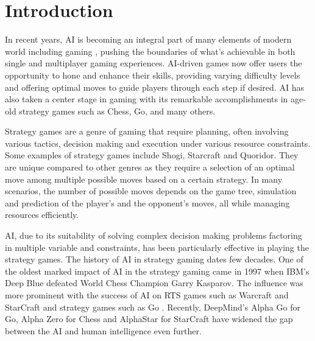 \chapter{Introduction}

In recent years, \gls{AI} is becoming an integral part of many elements of modern world including gaming \citep{Skinner2010Artificial}, pushing the boundaries of what's achievable in both single and multiplayer gaming experiences. \gls{AI}-driven games now offer users the opportunity to hone and enhance their skills, providing varying difficulty levels and offering optimal moves to guide players through each step if desired. \gls{AI} has also taken a center stage in gaming with its remarkable accomplishments in age-old strategy games such as Chess, Go, and many others. 

% 

Strategy games are a genre of gaming that require planning, often involving various tactics, decision making and execution under various resource constraints. Some examples of strategy games include Shogi, Starcraft and Quoridor. They are unique compared to other genres as they require a selection of an optimal move among multiple possible moves based on a certain strategy. In many scenarios, the number of possible moves depends on the game tree, simulation and prediction of the player's and the opponent's moves, all while managing resources efficiently.

\gls{AI}, due to its suitability of solving complex decision making problems factoring in multiple variable and constraints, has been particularly effective in playing the strategy games. The history of \gls{AI} in strategy gaming dates few decades. One of the oldest marked impact of \gls{AI} in the strategy gaming came in 1997 when IBM's Deep Blue \citep{Campbell2002Deep} defeated World Chess Champion Garry Kasparov. The influence was more prominent with the success of \gls{AI} on \gls{RTS} games such as Warcraft and StarCraft \citep{Robertson2014Review} and strategy games such as Go \citep{Huang2011Monte}. Recently, DeepMind's Alpha Go for Go, Alpha Zero for Chess \citep{Silver2017Mastering} and AlphaStar for StarCraft \citep{Team2019Alphastar} have widened the gap between the \gls{AI} and human intelligence even further.

